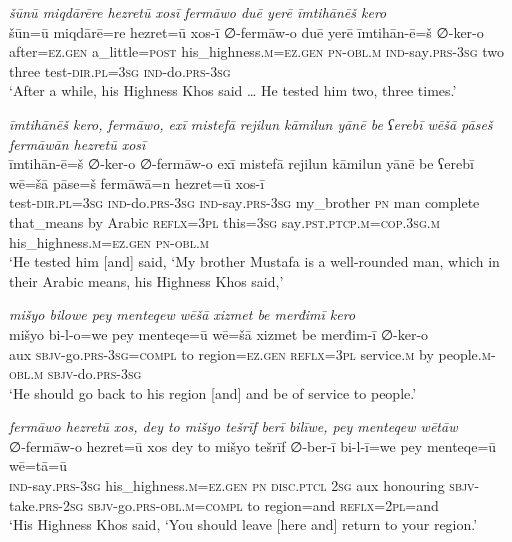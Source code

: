 \ea \label{ŽP.82}
\textit{šūnū miqdārēre hezretū xosī fermāwo duē yerē īmtihānēš kero} \\ 
\gll šūn=ū miqdārē=re hezret=ū xos-ī ∅-fermāw-o duē yerē īmtihān-ē=š ∅-ker-o \\ 
 after\textsc{\textsc{=ez.gen}} a\_little\textsc{=\textsc{post}} his\_highness\textsc{.m}\textsc{\textsc{=ez.gen}} \textsc{pn}\textsc{-obl}\textsc{.m} \textsc{ind-}say\textsc{.prs}\textsc{-3sg} two three test\textsc{-dir}\textsc{.pl}\textsc{=3sg} \textsc{ind-}do\textsc{.prs}\textsc{-3sg} \\ 
\glt `After a while, his Highness Khos said … He tested him two, three times.'
\z 
 
\ea \label{ŽP.83}
\textit{īmtihānēš kero, fermāwo, exī mistefā rejilun kāmilun yānē be ʕerebī wēšā pāseš fermāwān hezretū xosī} \\ 
\gll īmtihān-ē=š ∅-ker-o ∅-fermāw-o exī mistefā rejilun kāmilun yānē be ʕerebī wē=šā pāse=š fermāwā=n hezret=ū xos-ī \\ 
 test\textsc{-dir}\textsc{.pl}\textsc{=3sg} \textsc{ind-}do\textsc{.prs}\textsc{-3sg} \textsc{ind-}say\textsc{.prs}\textsc{-3sg} my\_brother \textsc{pn} man complete that\_means by Arabic \textsc{reflx}\textsc{=3pl} this\textsc{=3sg} say\textsc{.pst}\textsc{.ptcp}\textsc{.m}\textsc{=cop}\textsc{.3sg}\textsc{.m} his\_highness\textsc{.m}\textsc{\textsc{=ez.gen}} \textsc{pn}\textsc{-obl}\textsc{.m} \\ 
\glt `He tested him [and] said, ‘My brother Mustafa is a well-rounded man, which in their Arabic means, his Highness Khos said,'
\z 
 
\ea \label{ŽP.87}
\textit{mišyo bilowe pey menteqew wēšā xizmet be merđimī kero} \\ 
\gll mišyo bi-l-o=we pey menteqe=ū wē=šā xizmet be merđim-ī ∅-ker-o \\ 
 aux \textsc{sbjv-}go\textsc{.prs}\textsc{-3sg}\textsc{=compl} to region\textsc{\textsc{=ez.gen}} \textsc{reflx}\textsc{=3pl} service\textsc{.m} by people\textsc{.m}\textsc{-obl}\textsc{.m} \textsc{sbjv-}do\textsc{.prs}\textsc{-3sg} \\ 
\glt `He should go back to his region [and] and be of service to people.'
\z 
 
\ea \label{ŽP.91}
\textit{fermāwo hezretū xos, dey to mišyo tešrīf berī bilīwe, pey menteqew wētāw} \\ 
\gll ∅-fermāw-o hezret=ū xos dey to mišyo tešrīf ∅-ber-ī bi-l-ī=we pey menteqe=ū wē=tā=ū \\ 
 \textsc{ind-}say\textsc{.prs}\textsc{-3sg} his\_highness\textsc{.m}\textsc{\textsc{=ez.gen}} \textsc{pn} \textsc{disc.ptcl} \textsc{2sg} aux honouring \textsc{sbjv-}take\textsc{.prs}-\textsc{2sg} \textsc{sbjv-}go\textsc{.prs}\textsc{-obl}\textsc{.m}\textsc{=compl} to region=and \textsc{reflx}=\textsc{2pl}=and \\ 
\glt `His Highness Khos said, ‘You should leave [here and] return to your region.'
\z 
 
